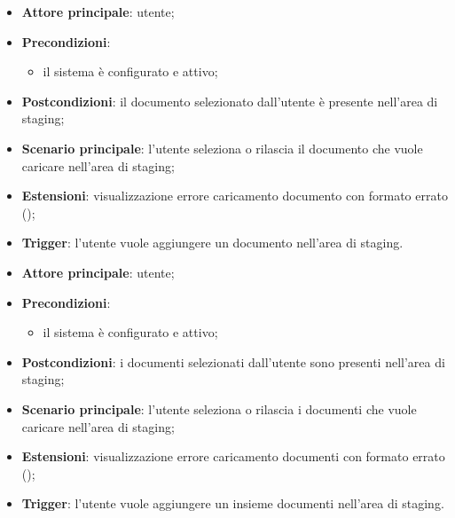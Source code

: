 \documentclass[10pt, a4paper]{article}
\begin{document}
    \begin{itemize}
        \item \textbf{Attore principale}: utente;
        \item \textbf{Precondizioni}:
            \begin{itemize}
                \item il sistema è configurato e attivo;
            \end{itemize}
        \item \textbf{Postcondizioni}: il documento selezionato dall’utente è presente nell’area di staging;
        \item \textbf{Scenario principale}: l’utente seleziona o rilascia il documento che vuole caricare nell’area di staging;
        \item \textbf{Estensioni}: visualizzazione errore caricamento documento con formato errato ();
        \item \textbf{Trigger}: l’utente vuole aggiungere un documento nell’area di staging.
    \end{itemize}

    \begin{itemize}
        \item \textbf{Attore principale}: utente;
        \item \textbf{Precondizioni}:
            \begin{itemize}
                \item il sistema è configurato e attivo;
            \end{itemize}
        \item \textbf{Postcondizioni}: i documenti selezionati dall’utente sono presenti nell’area di staging;
        \item \textbf{Scenario principale}: l’utente seleziona o rilascia i documenti che vuole caricare nell’area di staging;
        \item \textbf{Estensioni}: visualizzazione errore caricamento documenti con formato errato ();
        \item \textbf{Trigger}: l’utente vuole aggiungere un insieme documenti nell’area di staging.
    \end{itemize}
\end{document}
